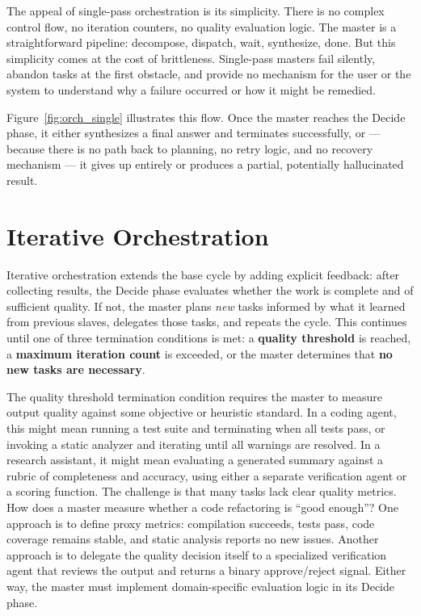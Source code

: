 The appeal of single-pass orchestration is its simplicity. There is no complex control flow, no iteration counters, no quality evaluation logic. The master is a straightforward pipeline: decompose, dispatch, wait, synthesize, done. But this simplicity comes at the cost of brittleness. Single-pass masters fail silently, abandon tasks at the first obstacle, and provide no mechanism for the user or the system to understand why a failure occurred or how it might be remedied.

Figure~\ref{fig:orch_single} illustrates this flow. Once the master reaches the Decide phase, it either synthesizes a final answer and terminates successfully, or — because there is no path back to planning, no retry logic, and no recovery mechanism — it gives up entirely or produces a partial, potentially hallucinated result.

\section{Iterative Orchestration}\label{sec:iterative}

Iterative orchestration extends the base cycle by adding explicit feedback: after collecting results, the Decide phase evaluates whether the work is complete and of sufficient quality. If not, the master plans \emph{new} tasks informed by what it learned from previous slaves, delegates those tasks, and repeats the cycle. This continues until one of three termination conditions is met: a \textbf{quality threshold} is reached, a \textbf{maximum iteration count} is exceeded, or the master determines that \textbf{no new tasks are necessary}.

The quality threshold termination condition requires the master to measure output quality against some objective or heuristic standard. In a coding agent, this might mean running a test suite and terminating when all tests pass, or invoking a static analyzer and iterating until all warnings are resolved. In a research assistant, it might mean evaluating a generated summary against a rubric of completeness and accuracy, using either a separate verification agent or a scoring function. The challenge is that many tasks lack clear quality metrics. How does a master measure whether a code refactoring is ``good enough''? One approach is to define proxy metrics: compilation succeeds, tests pass, code coverage remains stable, and static analysis reports no new issues. Another approach is to delegate the quality decision itself to a specialized verification agent that reviews the output and returns a binary approve/reject signal. Either way, the master must implement domain-specific evaluation logic in its Decide phase.

